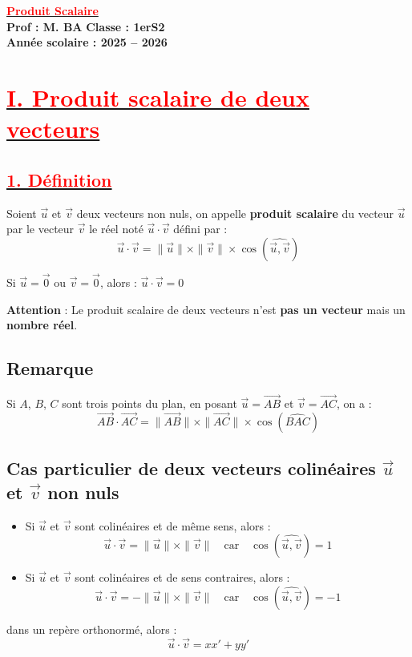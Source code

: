 \documentclass[12pt,a4paper]{article}
\begin{document}
\begin{center}
    \Large\textbf{\underline{\textcolor{red}{Produit Scalaire}}}\\[-0.1cm]
    \normalsize\textbf{Prof : M. BA} \hfill \textbf{Classe : 1erS2}\\[-0.1cm]
    \textbf{Année scolaire : 2025 -- 2026}
\end{center}

\section*{\underline{\textbf{\textcolor{red}{I. Produit scalaire de deux vecteurs}}}}
\subsection*{\underline{\textbf{\textcolor{red}{1. Définition }}}}

Soient $\vec{u}$ et $\vec{v}$ deux vecteurs non nuls, on appelle \textbf{produit scalaire} du vecteur $\vec{u}$ par le vecteur $\vec{v}$ le réel noté $\vec{u} \cdot \vec{v}$ défini par :
\[
\vec{u} \cdot \vec{v} = \|\vec{u}\| \times \|\vec{v}\| \times \cos(\widehat{\vec{u}, \vec{v}})
\]

Si $\vec{u} = \vec{0}$ ou $\vec{v} = \vec{0}$, alors :
\(
\vec{u} \cdot \vec{v} = 0
\)

\textbf{Attention} : Le produit scalaire de deux vecteurs n'est \textbf{pas un vecteur} mais un \textbf{nombre réel}.

\subsection*{Remarque}

Si $A$, $B$, $C$ sont trois points du plan, en posant $\vec{u} = \overrightarrow{AB}$ et $\vec{v} = \overrightarrow{AC}$, on a :
\[
\overrightarrow{AB} \cdot \overrightarrow{AC} = \|\overrightarrow{AB}\| \times \|\overrightarrow{AC}\| \times \cos(\widehat{BAC})
\]

\subsection*{Cas particulier de deux vecteurs colinéaires $\vec{u}$ et $\vec{v}$ non nuls}

\begin{itemize}
    \item Si $\vec{u}$ et $\vec{v}$ sont colinéaires et de même sens, alors :
    \[
    \vec{u} \cdot \vec{v} = \|\vec{u}\| \times \|\vec{v}\| \quad \text{car} \quad \cos(\widehat{\vec{u}, \vec{v}}) = 1
    \]
    \item Si $\vec{u}$ et $\vec{v}$ sont colinéaires et de sens contraires, alors :
    \[
    \vec{u} \cdot \vec{v} = -\|\vec{u}\| \times \|\vec{v}\| \quad \text{car} \quad \cos(\widehat{\vec{u}, \vec{v}}) = -1
    \]
\end{itemize}
dans un repère orthonormé, alors :
\[
\vec{u} \cdot \vec{v} = xx' + yy'
\]
\end{document}
